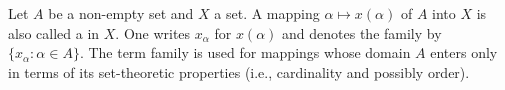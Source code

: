 Let $A$ be a non-empty set and $X$ a set. A mapping $\alpha \mapsto x(\alpha)$ of $A$ into $X$ is also called a  in $X$. One writes $x_\alpha$ for $x(\alpha)$ and denotes the family by $\{x_\alpha: \alpha \in A\}$. The term family is used for mappings whose domain $A$ enters only in terms of its set-theoretic properties (i.e., cardinality and possibly order).
